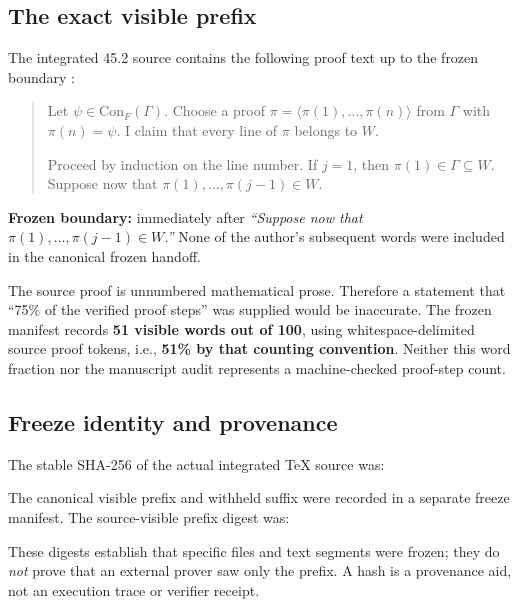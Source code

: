 \documentclass[11pt,letterpaper]{article}
\begin{document}
\subsection{The exact visible prefix}
The integrated 45.2 source contains the following proof text up to the frozen boundary \cite{integrated}:
\begin{quote}\small
Let $\psi \in \mathrm{Con}_{F}(\Gamma)$. Choose a proof $\pi = \langle \pi(1),\dots,\pi(n) \rangle$ from $\Gamma$ with $\pi(n) = \psi$. I claim that every line of $\pi$ belongs to $W$.

Proceed by induction on the line number. If $j = 1$, then $\pi(1) \in \Gamma \subseteq W$. Suppose now that $\pi(1),\dots,\pi(j-1) \in W$.
\end{quote}
\begin{resultbox}
\textbf{Frozen boundary:} immediately after \emph{``Suppose now that $\pi(1),\dots,\pi(j-1)\in W$.''} None of the author's subsequent words were included in the canonical frozen handoff.
\end{resultbox}
The source proof is unnumbered mathematical prose. Therefore a statement that ``75\% of the verified proof steps'' was supplied would be inaccurate. The frozen manifest records \textbf{51 visible words out of 100}, using whitespace-delimited source proof tokens, i.e., \textbf{51\% by that counting convention}. Neither this word fraction nor the manuscript audit represents a machine-checked proof-step count.

\subsection{Freeze identity and provenance}
The stable SHA-256 of the actual integrated TeX source was:
\begin{quote}\ttfamily\footnotesize{}\end{quote}
The canonical visible prefix and withheld suffix were recorded in a separate freeze manifest. The source-visible prefix digest was:
\begin{quote}\ttfamily\footnotesize{}\end{quote}
These digests establish that specific files and text segments were frozen; they do \emph{not} prove that an external prover saw only the prefix. A hash is a provenance aid, not an execution trace or verifier receipt.
\end{document}

